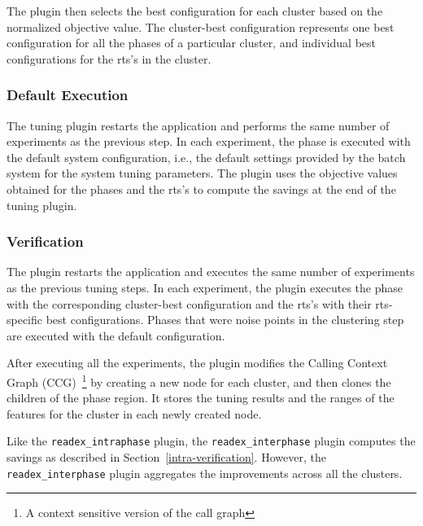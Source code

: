 The plugin then selects the best configuration for each cluster based on the normalized objective value. The cluster-best configuration represents one best configuration for all the phases of a particular cluster, and individual best configurations for the rts's in the cluster.

\subsubsection{Default Execution} \label{default-execution} 
The tuning plugin restarts the application and performs the same number of experiments as the previous step. In each experiment, the phase is executed with the default system configuration, i.e., the default settings provided by the batch system for the system tuning parameters. The plugin uses the objective values obtained for the phases and the rts's to compute the savings at the end of the tuning plugin.

\subsubsection{Verification} \label{verification} 
The plugin restarts the application and executes the same number of experiments as the previous tuning steps. In each experiment, the plugin executes the phase with the
corresponding cluster-best configuration and the rts's with their rts-specific
best configurations. Phases that were noise points in the clustering step are executed with the default configuration.

After executing all the experiments, the plugin modifies the Calling Context Graph (CCG)~\footnote{A context sensitive version of the call graph} by creating a new node for each cluster, and then clones the children of the phase region. It stores the tuning results and the ranges of the features for the cluster in each newly created node. 

Like the \texttt{readex\_intraphase} plugin, the \texttt{readex\_interphase} plugin computes the savings as described in Section~\ref{intra-verification}. However, the \texttt{readex\_interphase} plugin aggregates the improvements across all the clusters.


